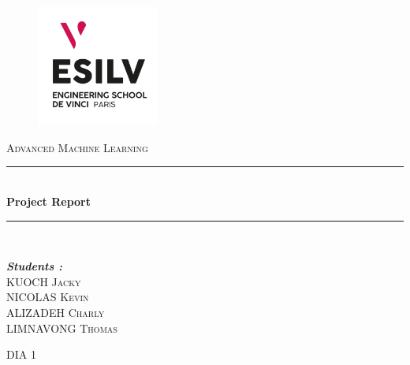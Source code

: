 \documentclass[a4paper, 12pt, one column]{article}
\newcommand{\HRule}{\rule{\linewidth}{0.5mm}}
\begin{document}
\begin{titlepage}
  \begin{sffamily}
  \begin{center}

    \begin{figure}[h]
	    \includegraphics[width=4cm]{logo_esilv_png_blanc.png}\hfill
	\end{figure}  	
	
    \vspace{2cm}
    \textsc{\LARGE Advanced Machine Learning}\\[0.5cm]
    \vspace{2cm}


    \HRule \\[0.4cm]
    { \huge \bfseries Project Report}
    \HRule \\[0.4cm]

    \vspace{3cm}

  \end{center}
    \begin{minipage}{0.4\textwidth}
      \begin{flushleft} \large
		\textbf{\textit{Students :}} \\        
        \textsc{KUOCH Jacky}\\
        \textsc{NICOLAS Kevin}\\
        \textsc{ALIZADEH Charly}\\
        \textsc{LIMNAVONG Thomas}\\
      \end{flushleft}
    \end{minipage}
    
    \begin{minipage}{0.9\textwidth}
      \begin{flushright} \large
        \textsc{DIA 1}\\
      \end{flushright}
      
    \end{minipage}
  
  \end{sffamily}
\end{titlepage}
\end{document}
